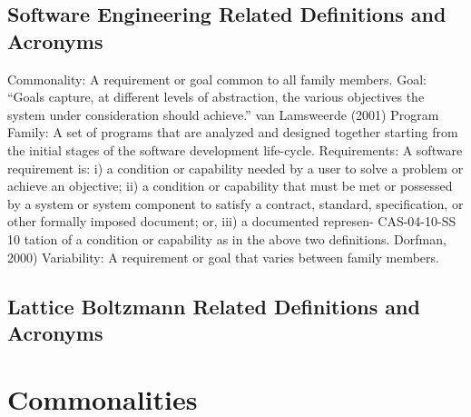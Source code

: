 \documentclass[12pt]{article}
\begin{document}
\subsection{Software Engineering Related Definitions and Acronyms}
Commonality: A requirement or goal common to all family members.
Goal: “Goals capture, at different levels of abstraction, the various objectives the system
under consideration should achieve.” van Lamsweerde (2001)
Program Family: A set of programs that are analyzed and designed together starting
from the initial stages of the software development life-cycle.
Requirements: A software requirement is: i) a condition or capability needed by a user
to solve a problem or achieve an objective; ii) a condition or capability that must be
met or possessed by a system or system component to satisfy a contract, standard,
specification, or other formally imposed document; or, iii) a documented represen-
CAS-04-10-SS
10
tation of a condition or capability as in the above two definitions.
Dorfman, 2000)
Variability: A requirement or goal that varies between family members.
\subsection{Lattice Boltzmann Related Definitions and Acronyms}
\newpage
\section{Commonalities}
\end{document}
